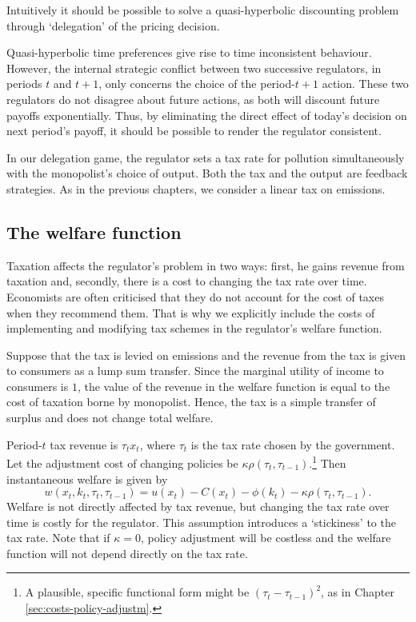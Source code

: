 \label{sec:regul-with-deleg}

Intuitively it should be possible to solve a quasi-hyperbolic discounting
problem through `delegation' of the pricing decision.

Quasi-hyperbolic time preferences give rise to time inconsistent behaviour.
However, the internal strategic conflict between two successive regulators,
in periods $t$ and $t+1$, only concerns the choice of the period-$t+1$
action. These two regulators do not disagree about future actions, as both
will discount future payoffs exponentially. Thus, by eliminating the direct
effect of today's decision on next period's payoff, it should be possible to
render the regulator consistent.

In our delegation game, the regulator sets a tax rate for pollution
simultaneously with the monopolist's choice of output. Both the tax and the
output are feedback strategies. As in the previous chapters, we consider a
linear tax on emissions.

\subsection{The welfare function}

\label{sec:welfare-function-1}

Taxation affects the regulator's problem in two ways: first, he gains
revenue from taxation and, secondly, there is a cost to changing the tax
rate over time. Economists are often criticised that they do not account for
the cost of taxes when they recommend them. That is why we explicitly
include the costs of implementing and modifying tax schemes in the
regulator's welfare function.

Suppose that the tax is levied on emissions and the revenue from the tax is
given to consumers as a lump sum transfer. Since the marginal utility of
income to consumers is $1$, the value of the revenue in the welfare function
is equal to the cost of taxation borne by monopolist. Hence, the tax is a
simple transfer of surplus and does not change total welfare.

Period-$t$ tax revenue is $\tau _{t}x_{t}$, where $\tau _{t}$ is the tax
rate chosen by the government. Let the adjustment cost of changing policies
be $\kappa \rho (\tau _{t},\tau _{t-1})$.\footnote{%
A plausible, specific functional form might be $\left( \tau _{t}-\tau
_{t-1}\right) ^{2}$, as in Chapter \ref{sec:costs-policy-adjustm}.} Then
instantaneous welfare is given by 
\[
w(x_{t},k_{t},\tau _{t},\tau _{t-1})=u(x_{t})-C(x_{t})-\phi (k_{t})-\kappa
\rho (\tau _{t},\tau _{t-1}). 
\]%
Welfare is not directly affected by tax revenue, but changing the tax rate
over time is costly for the regulator. This assumption introduces a
`stickiness' to the tax rate. Note that if $\kappa =0$, policy adjustment
will be costless and the welfare function will not depend directly on the
tax rate.


